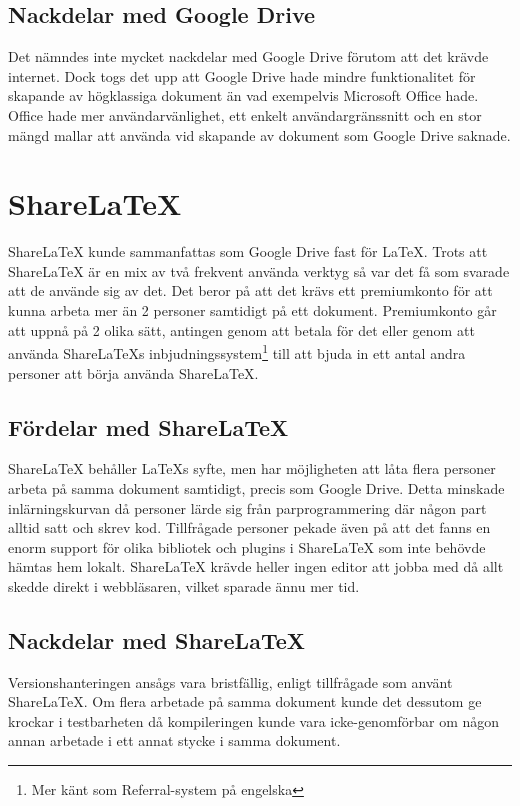 \subsection{Nackdelar med Google Drive}
Det nämndes inte mycket nackdelar med Google Drive förutom att det krävde internet. Dock togs det upp att Google Drive hade mindre funktionalitet för skapande av högklassiga dokument än vad exempelvis Microsoft Office hade. Office hade mer användarvänlighet, ett enkelt användargränssnitt och en stor mängd mallar att använda vid skapande av dokument som Google Drive saknade.

\section{ShareLaTeX}
\label{sec:wassing-sharelatex}
ShareLaTeX kunde sammanfattas som Google Drive fast för LaTeX. Trots att ShareLaTeX är en mix av två frekvent använda verktyg så var det få som svarade att de använde sig av det. Det beror på att det krävs ett premiumkonto för att kunna arbeta mer än 2 personer samtidigt på ett dokument. Premiumkonto går att uppnå på 2 olika sätt, antingen genom att betala för det eller genom att använda ShareLaTeXs inbjudningssystem\footnote{Mer känt som Referral-system på engelska} till att bjuda in ett antal andra personer att börja använda ShareLaTeX. %

\subsection{Fördelar med ShareLaTeX}
ShareLaTeX behåller LaTeXs syfte, men har möjligheten att låta flera personer arbeta på samma dokument samtidigt, precis som Google Drive. Detta minskade inlärningskurvan då personer lärde sig från parprogrammering där någon part alltid satt och skrev kod. Tillfrågade personer pekade även på att det fanns en enorm support för olika bibliotek och plugins i ShareLaTeX som inte behövde hämtas hem lokalt. ShareLaTeX krävde heller ingen editor att jobba med då allt skedde direkt i webbläsaren, vilket sparade ännu mer tid.
 
\subsection{Nackdelar med ShareLaTeX}
Versionshanteringen ansågs vara bristfällig, enligt tillfrågade som använt ShareLaTeX. Om flera arbetade på samma dokument kunde det dessutom ge krockar i testbarheten då kompileringen kunde vara icke-genomförbar om någon annan arbetade i ett annat stycke i samma dokument.


